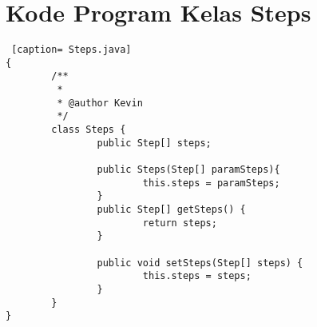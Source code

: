 \chapter{Kode Program Kelas Steps}
\label{Kode Program Kelas Steps}

\begin{lstlisting} [caption= Steps.java]
{ 
		/**
		 *
		 * @author Kevin
		 */
		class Steps {
				public Step[] steps;

				public Steps(Step[] paramSteps){
						this.steps = paramSteps;
				}
				public Step[] getSteps() {
						return steps;
				}

				public void setSteps(Step[] steps) {
						this.steps = steps;
				}
		}
}
\end{lstlisting}